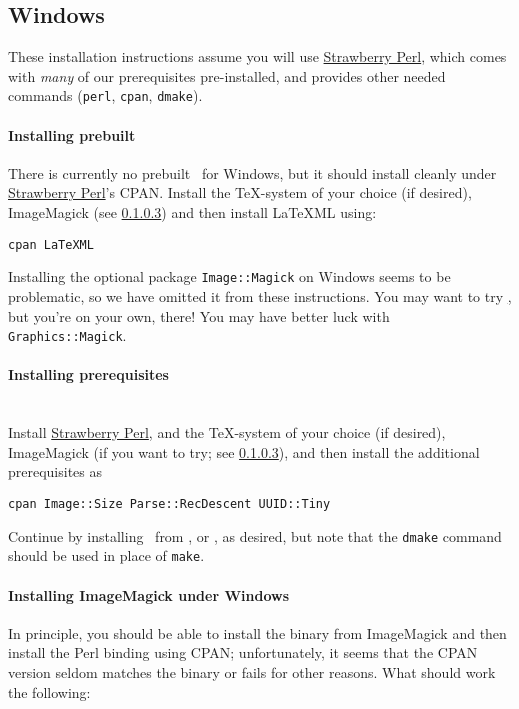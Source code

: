 \documentclass{article}
\begin{document}
\subsection{Windows}
These installation instructions assume you will use
\href{http://strawberryperl.com}{Strawberry Perl},
which comes with \emph{many} of our prerequisites pre-installed,
and provides other needed commands (\texttt{perl}, \texttt{cpan}, \texttt{dmake}).

\paragraph{Installing prebuilt}\label{install.windows}
There is currently no prebuilt \LaTeXML\ for Windows,
but it should install cleanly under \href{http://strawberryperl.com}{Strawberry Perl}'s CPAN.
Install the \TeX-system of your choice (if desired),
ImageMagick (see \ref{install.windows.imagemagick})
and then install LaTeXML using:
\begin{lstlisting}[style=shell]
cpan LaTeXML
\end{lstlisting}

Installing the optional package \texttt{Image::Magick} on Windows seems to be problematic,
so we have omitted it from these instructions.
You may want to try \href{ImageMagick}, but
you're on your own, there!  You may  have better luck with \texttt{Graphics::Magick}.

\paragraph{Installing prerequisites}\label{install.windows.prereq}\\
Install \href{http://strawberryperl.com}{Strawberry Perl}, and
the \TeX-system of your choice (if desired), 
ImageMagick (if you want to try; see \ref{install.windows.imagemagick}),
and then install the additional prerequisites as
\begin{lstlisting}[style=shell]
cpan Image::Size Parse::RecDescent UUID::Tiny
\end{lstlisting}
Continue by installing \LaTeXML\ from
, 
or , as desired,
but note that the \texttt{dmake} command should be used in place of \texttt{make}.

\paragraph{Installing ImageMagick under Windows}\label{install.windows.imagemagick}
In principle, you should be able to install the binary from ImageMagick
and then install the Perl binding using CPAN; unfortunately, it seems that the
CPAN version seldom matches the binary or fails for other reasons.  What
should work the following:
\end{document}
